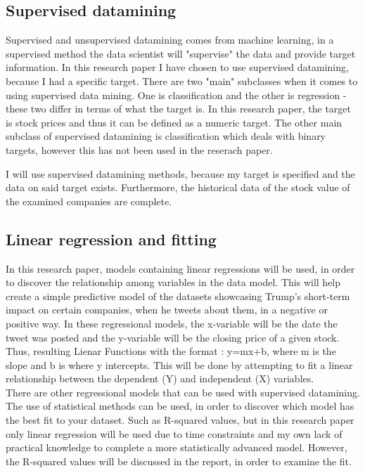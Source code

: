 \documentclass{article}
\begin{document}
\subsection{Supervised datamining}
Supervised and unsupervised datamining comes from machine learning, in a supervised method the data scientist will "supervise" the data and provide target information. In this research paper I have chosen to use supervised datamining, because I had a specific target.  There are two "main" subclasses when it comes to using supervised data mining. One is classification and the other is regression - these two differ in terms of what the target is. In this research paper, the target is stock prices and thus it can be defined as a numeric target. The other main subclass of supervised datamining is classification which deals with binary targets, however this has not been used in the reserach paper.

I will use supervised datamining methods, because my target is specified and the data on said target exists. Furthermore, the historical data of the stock value of the examined companies are complete.



\subsection{Linear regression and fitting}
In this research paper, models containing linear regressions will be used, in order to discover the relationship among variables in the data model.  This will help create a simple predictive model of the datasets showcasing Trump's short-term impact on certain companies, when he tweets about them, in a negative or positive way. In these regressional models, the x-variable will be the date the tweet was posted and the y-variable will be the closing price of a given stock. Thus, resulting Lienar  Functions with the format : y=mx+b, where m is the slope and b is where y intercepts. This will be done by attempting to fit a linear relationship between the dependent (Y) and independent (X) variables. \\

There are other regressional models that can be used with supervised datamining. The use of statistical methods can be used, in order to discover which model has the best fit to your dataset. Such as  R-squared values, but in this research paper only linear regression will be used due to time constraints and my own lack of practical knowledge to complete a more statistically advanced model. However, the R-squared values will be discussed in the report, in order to examine the fit. \\
\end{document}
